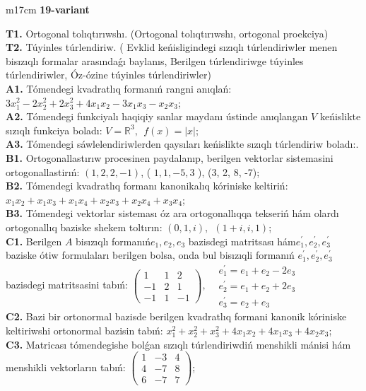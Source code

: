 \documentclass{article}
\begin{document}
\begin{tabular}{m{17cm}}
\textbf{19-variant}
\newline

\textbf{T1.} Ortogonal  tolıqtırıwshı. (Ortogonal tolıqtırıwshı,  ortogonal proekciya) \\
\textbf{T2.} Túyinles túrlendiriw. ( Evklid keńisligindegi sızıqlı túrlendiriwler menen bisızıqlı formalar arasındaǵı baylanıs, Berilgen túrlendiriwge túyinles túrlendiriwler, Óz-ózine túyinles túrlendiriwler) \\
\textbf{A1.} Tómendegi kvadratlıq formanıń rangni anıqlań: \(3x_{1}^{2} - 2x_{2}^{2} + 2x_{3}^{2} + 4x_{1}x_{2} - 3x_{1}x_{3} - x_{2}x_{3}\); \\
\textbf{A2.} Tómendegi funkciyalı haqiqiy sanlar maydanı ústinde anıqlangan \(V\) keńislikte sızıqlı funkciya boladı: \(V = \mathbb{R}^{3},\ \ f(x) = |x|\); \\
\textbf{A3.} Tómendegi sáwlelendiriwlerden qaysıları keńislikte sızıqlı túrlendiriw boladı:. \\
\textbf{B1.} Ortogonallastırıw procesinen paydalanıp, berilgen vektorlar sistemasini ortogonallastirıń: \((1,2,2, - 1)\), ( \(1,1, - 5,3\) ), (3, 2, 8, -7); \\
\textbf{B2.} Tómendegi kvadratlıq formanı kanonikalıq kóriniske keltiriń: \(x_{1}x_{2} + x_{1}x_{3} + x_{1}x_{4} + x_{2}x_{3} + x_{2}x_{4} + x_{3}x_{4}\); \\
\textbf{B3.} Tómendegi vektorlar sisteması óz ara ortogonallıqqa tekseriń hám olardı ortogonallıq baziske shekem toltırın: \((0,1,i),\ \ (1 + i,i,1)\); \\
\textbf{C1.} Berilgen \(A\) bisızıqlı formanıń\(e_{1},e_{2},e_{3}\) bazisdegi matritsası hám\(e_{1}^{'},e_{2}^{'},e_{3}^{'}\) baziske ótiw formulaları berilgen bolsa, onda bul bisızıqli formanıń \(e_{1}^{'},e_{2}^{'},e_{3}^{'}\) bazisdegi matritsasini tabıń: \(\begin{pmatrix} 1 & 1 & 2 \\  - 1 & 2 & 1 \\  - 1 & 1 & - 1 \end{pmatrix},\begin{matrix}  & e_{1}^{'} = e_{1} + e_{2} - 2e_{3} \\  & e_{2}^{'} = e_{1} + e_{2} + 2e_{3} \\  & e_{3}^{'} = e_{2} + e_{3} \end{matrix}\) \\
\textbf{C2.} Bazi bir ortonormal bazisde berilgen kvadratlıq formani kanonik kóriniske keltiriwshi ortonormal bazisin tabıń: \(x_{1}^{2} + x_{2}^{2} + x_{3}^{2} + 4x_{1}x_{2} + 4x_{1}x_{3} + 4x_{2}x_{3}\); \\
\textbf{C3.} Matricası tómendegishe bolǵan sızıqlı túrlendiriwdiń menshikli mánisi hám menshikli vektorların tabıń: \(\begin{pmatrix} 1 & - 3 & 4 \\ 4 & - 7 & 8 \\ 6 & - 7 & 7 \end{pmatrix}\); \\

\end{tabular}
\vspace{1cm}
\end{document}
